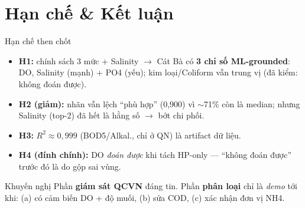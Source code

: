 \documentclass[aspectratio=169]{beamer}
\begin{document}
\section{Hạn chế \& Kết luận}
\begin{frame}{Hạn chế then chốt}
  \begin{itemize}
    \item \textbf{H1:} chính sách 3 mức + Salinity $\to$ Cát Bà có \textbf{3 chỉ số ML-grounded}: DO, Salinity (mạnh) + PO4 (yếu); kim loại/Coliform vẫn trung vị (đã kiểm: không đoán được).
    \item \textbf{H2 (giảm):} nhãn vẫn lệch ``phù hợp'' (0{,}900) vì $\sim$71\% còn là median; nhưng Salinity (top-2) đã hết là hằng số $\to$ bớt chi phối.
    \item \textbf{H3:} $R^2{\approx}0{,}999$ (BOD5/Alkal., chỉ ở QN) là artifact dữ liệu.
    \item \textbf{H4 (đính chính):} DO \emph{đoán được} khi tách HP-only --- ``không đoán được'' trước đó là do gộp sai vùng.
  \end{itemize}
  \vfill
  \begin{block}{Khuyến nghị}
    Phần \textbf{giám sát QCVN} đáng tin. Phần \textbf{phân loại} chỉ là \emph{demo} tới khi: (a) có cảm biến DO + độ muối, (b) sửa COD, (c) xác nhận đơn vị NH4.
  \end{block}
\end{frame}
\end{document}
